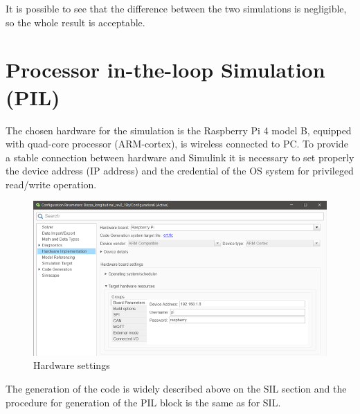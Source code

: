 \documentclass[12pt,a4paper]{report}
\begin{document}
It is possible to see that the difference between the two simulations is negligible, so the whole result is acceptable.
\section{Processor in-the-loop Simulation (PIL)}

The chosen hardware for the simulation is the Raspberry Pi 4 model B, equipped with quad-core processor (ARM-cortex), is wireless connected to PC.
To provide a stable connection between hardware and Simulink it is necessary to set properly the device address (IP address) and the credential of the OS system for privileged read/write operation.


\begin{figure}[htbp]
	\centering
	\includegraphics[scale=0.8]{hw_implementation.png}
	\caption{Hardware settings}
\end{figure} \FloatBarrier

The generation of the code is widely described above on the SIL section and the procedure for generation of the PIL block is the same as for SIL.
\end{document}
